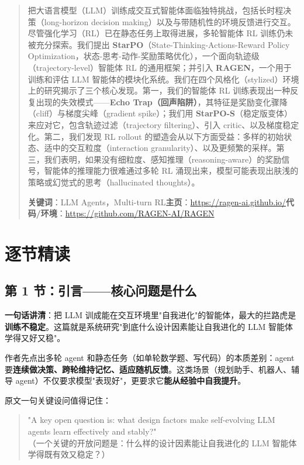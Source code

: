 \documentclass[11pt,UTF8,fontset=fandol]{ctexart}
\begin{document}
\begin{quote}\small
把大语言模型（LLM）训练成交互式智能体面临独特挑战，包括长时程决策（long-horizon decision making）以及与带随机性的环境反馈进行交互。尽管强化学习（RL）已在静态任务上取得进展，多轮智能体 RL 训练仍未被充分探索。我们提出 \textbf{StarPO}（State-Thinking-Actions-Reward Policy Optimization，状态-思考-动作-奖励策略优化），一个面向轨迹级（trajectory-level）智能体 RL 的通用框架；并引入 \textbf{RAGEN}，一个用于训练和评估 LLM 智能体的模块化系统。我们在四个风格化（stylized）环境上的研究揭示了三个核心发现。第一，我们的智能体 RL 训练表现出一种反复出现的失效模式——\textbf{Echo Trap（回声陷阱）}，其特征是奖励变化骤降（cliff）与梯度尖峰（gradient spike）；我们用 \textbf{StarPO-S}（稳定版变体）来应对它，包含轨迹过滤（trajectory filtering）、引入 critic、以及梯度稳定化。第二，我们发现 RL rollout 的塑造会从以下方面受益：多样的初始状态、适中的交互粒度（interaction granularity）、以及更频繁的采样。第三，我们表明，如果没有细粒度、感知推理（reasoning-aware）的奖励信号，智能体的推理能力很难通过多轮 RL 涌现出来，模型可能表现出肤浅的策略或幻觉式的思考（hallucinated thoughts）。

\textbf{关键词}：LLM Agents，Multi-turn RL\quad\textbf{主页}：\url{https://ragen-ai.github.io/}\quad\textbf{代码/环境}：\url{https://github.com/RAGEN-AI/RAGEN}
\end{quote}

\section{逐节精读}

\subsection{第 1 节：引言——核心问题是什么}

\textbf{一句话讲清}：把 LLM 训成能在交互环境里"自我进化"的智能体，最大的拦路虎是\textbf{训练不稳定}。这篇就是系统研究"到底什么设计因素能让自我进化的 LLM 智能体学得又好又稳"。

作者先点出多轮 agent 和静态任务（如单轮数学题、写代码）的本质差别：agent 要\textbf{连续做决策、跨轮维持记忆、适应随机反馈}。这类场景（规划助手、机器人、辅导 agent）不仅要求模型"表现好"，更要求它\textbf{能从经验中自我提升}。

原文一句关键设问值得记住：
\begin{quote}\small
"A key open question is: what design factors make self-evolving LLM agents learn effectively and stably?"\\
（一个关键的开放问题是：什么样的设计因素能让自我进化的 LLM 智能体学得既有效又稳定？）
\end{quote}
\end{document}
